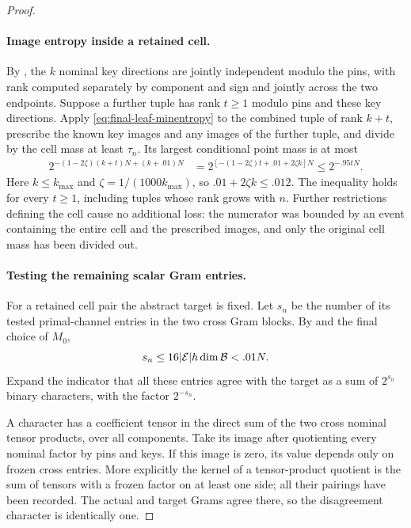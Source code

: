 \begin{proof}
\paragraph{Image entropy inside a retained cell.}
By , the $k$ nominal key directions
are jointly independent modulo the pins, with rank computed
separately by component and sign and jointly across the two
endpoints.  Suppose a further tuple has rank $t\ge1$ modulo
pins and these key directions.  Apply
\eqref{eq:final-leaf-minentropy} to the combined tuple of
rank $k+t$, prescribe the known key images and any images
of the further tuple, and divide by the cell mass at least
$\tau_n$.  Its largest conditional point mass is at most
\begin{align}\label{eq:cell-pmax}
 2^{-(1-2\zeta)(k+t)N+(k+.01)N}
 &=2^{[-(1-2\zeta)t+.01+2\zeta k]N}
 \le2^{-.95tN}.
\end{align}
Here $k\le k_{\max}$ and
$\zeta=1/(1000k_{\max})$, so $.01+2\zeta k\le .012$.
The inequality holds for every $t\ge1$, including tuples
whose rank grows with $n$.  Further restrictions defining
the cell cause no additional loss: the numerator was bounded
by an event containing the entire cell and the prescribed
images, and only the original cell mass has been divided out.

\paragraph{Testing the remaining scalar Gram entries.}
For a retained cell pair the abstract target is fixed.  Let
$s_n$ be the number of its tested primal-channel entries in
the two cross Gram blocks.  By
 and the final choice of $M_0$,
\[
 s_n\le16|\mathcal E|h\dim\mathcal B<.01N.
\]
Expand the indicator that all these entries agree with the
target as a sum of $2^{s_n}$ binary characters, with the
factor $2^{-s_n}$.

A character has a coefficient tensor in the direct sum of
the two cross nominal tensor products, over all components.
Take its image after quotienting every nominal factor by
pins and keys.  If this image is zero, its value depends
only on frozen cross entries.  More explicitly the kernel
of a tensor-product quotient is the sum of tensors with a
frozen factor on at least one side; all their pairings have
been recorded.  The actual and target Grams agree there,
so the disagreement character is identically one.


\end{proof}
